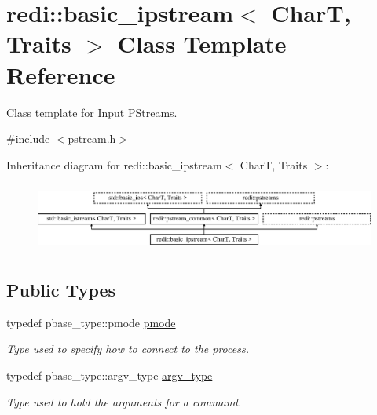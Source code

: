 \hypertarget{classredi_1_1basic__ipstream}{}\section{redi\+:\+:basic\+\_\+ipstream$<$ CharT, Traits $>$ Class Template Reference}
\label{classredi_1_1basic__ipstream}


Class template for Input P\+Streams.  




{\ttfamily \#include $<$pstream.\+h$>$}

Inheritance diagram for redi\+:\+:basic\+\_\+ipstream$<$ CharT, Traits $>$\+:\begin{figure}[H]
\begin{center}
\leavevmode
\includegraphics[height=2.295082cm]{classredi_1_1basic__ipstream}
\end{center}
\end{figure}
\subsection*{Public Types}
\begin{DoxyCompactItemize}
\item 
\mbox{\label{classredi_1_1basic__ipstream_acdb01dd760c82d233369511f43164663}} 
typedef pbase\+\_\+type\+::pmode \mbox{\hyperlink{classredi_1_1basic__ipstream_acdb01dd760c82d233369511f43164663}{pmode}}
\begin{DoxyCompactList}\small\item\em Type used to specify how to connect to the process. \end{DoxyCompactList}\item 
\mbox{\label{classredi_1_1basic__ipstream_a9f9103494564d72e0e950a7534d2b26d}} 
typedef pbase\+\_\+type\+::argv\+\_\+type \mbox{\hyperlink{classredi_1_1basic__ipstream_a9f9103494564d72e0e950a7534d2b26d}{argv\+\_\+type}}
\begin{DoxyCompactList}\small\item\em Type used to hold the arguments for a command. \end{DoxyCompactList}\end{DoxyCompactItemize}
